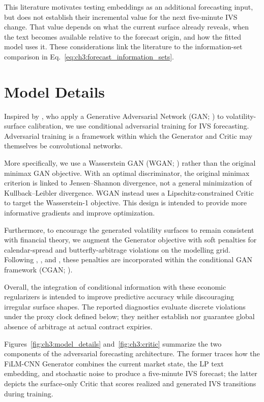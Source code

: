 This literature motivates testing embeddings as an additional forecasting input, but does not establish their incremental value for the next five-minute IVS change. That value depends on what the current surface already reveals, when the text becomes available relative to the forecast origin, and how the fitted model uses it. These considerations link the literature to the information-set comparison in Eq.~\eqref{eq:ch3:forecast_information_sets}.



\section{Model Details}\label{ch3:sec:model}

Inspired by \cite{vuletic2024volgan}, who apply a Generative Adversarial Network (GAN; \citealp{goodfellow2020generative}) to volatility-surface calibration, we use conditional adversarial training for IVS forecasting.  Adversarial training
is a framework within which the Generator and Critic may themselves be convolutional networks.


More specifically, we use a Wasserstein GAN (WGAN; \citealp{arjovsky2017wasserstein}) rather than the original minimax GAN objective.  With an optimal discriminator, the original minimax criterion is linked to Jensen--Shannon divergence, not a general minimization of Kullback--Leibler divergence.  WGAN instead uses a Lipschitz-constrained Critic to target the Wasserstein-1 objective.  This design is intended to provide more informative gradients and improve optimization.


Furthermore, to encourage the generated volatility surfaces to remain consistent with financial theory, we augment the Generator objective with soft penalties for calendar-spread and butterfly-arbitrage violations on the modelling grid. Following \cite{sidogi2022creating}, \cite{vuletic2024volgan}, and \cite{na2023computing}, these penalties are incorporated within the conditional GAN framework (CGAN; \citealp{mirza2014conditional}).


Overall, the integration of conditional information with these economic regularizers is intended to improve predictive accuracy while discouraging irregular surface shapes. The reported diagnostics evaluate discrete violations under the proxy clock defined below; they neither establish nor guarantee global absence of arbitrage at actual contract expiries.

Figures~\ref{fig:ch3:model_details} and~\ref{fig:ch3:critic} summarize the two
components of the adversarial forecasting architecture. The former traces how
the FiLM-CNN Generator combines the current market state, the LP text
embedding, and stochastic noise to produce a five-minute IVS forecast; the
latter depicts the surface-only Critic that scores realized and generated IVS
transitions during training.

